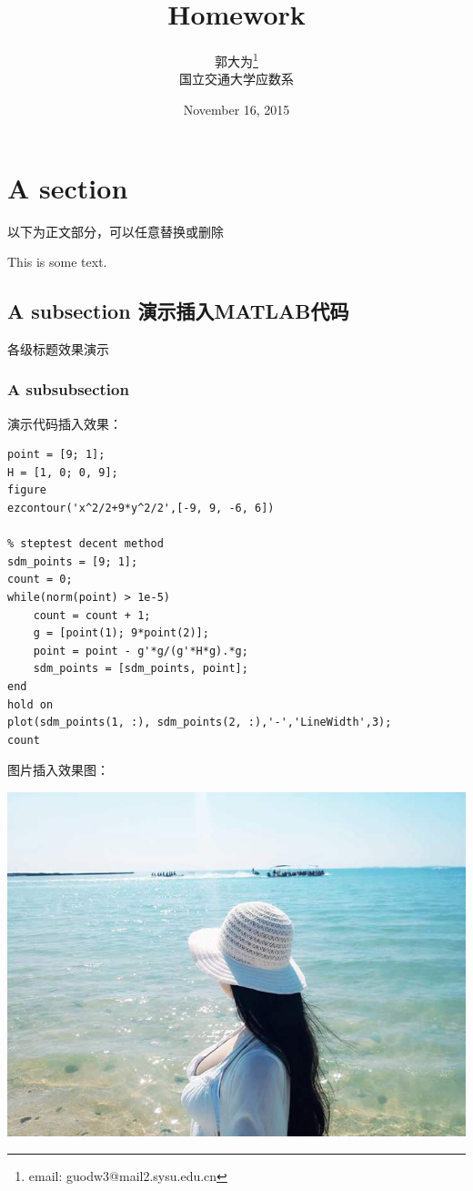 \documentclass[10pt,a4paper]{article}
\author{郭大为\footnote{email: guodw3@mail2.sysu.edu.cn}\\[2ex]
    国立交通大学应数系\\[2ex]}
\title{Homework \uppercase\expandafter{\romannumeral4}}
\date{November 16, 2015}
\begin{document}
\makeatletter
\let\@afterindentfalse\@afterindenttrue
\@afterindenttrue
\makeatother
\setlength{\parindent}{2em}  %

\maketitle

\section{A section}
以下为正文部分，可以任意替换或删除

This is some text.

\subsection{A subsection 演示插入MATLAB代码}
各级标题效果演示
\subsubsection{A subsubsection}
演示代码插入效果：
\begin{lstlisting}[title=sd\_method.m]
point = [9; 1];
H = [1, 0; 0, 9];
figure
ezcontour('x^2/2+9*y^2/2',[-9, 9, -6, 6])

% steptest decent method
sdm_points = [9; 1];
count = 0;
while(norm(point) > 1e-5)
    count = count + 1;
    g = [point(1); 9*point(2)];
    point = point - g'*g/(g'*H*g).*g;
    sdm_points = [sdm_points, point];
end
hold on
plot(sdm_points(1, :), sdm_points(2, :),'-','LineWidth',3);
count
\end{lstlisting}
图片插入效果图：
    \begin{center}
		\includegraphics[width=1\textwidth]{sea.jpg}
	\end{center}
\end{document}

